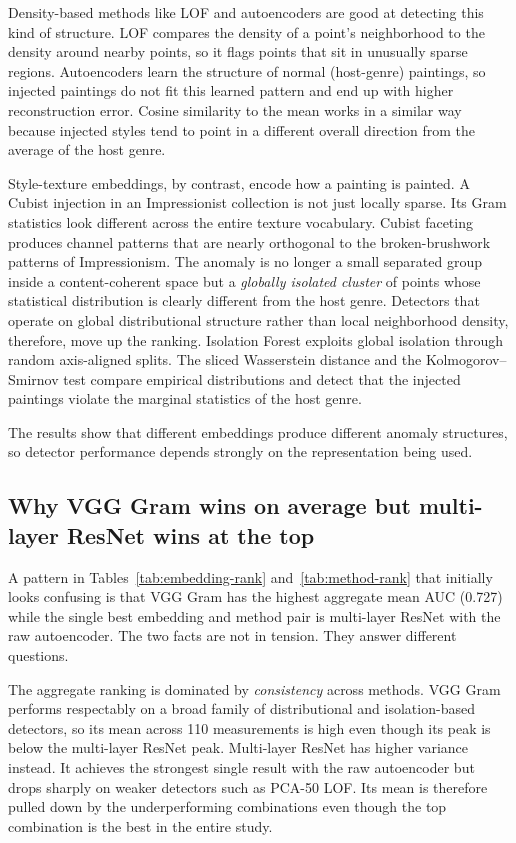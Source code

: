 \documentclass[conference]{IEEEtran}
\begin{document}
Density-based methods like LOF and autoencoders are good at detecting this kind of structure. LOF compares the density of a point’s neighborhood to the density around nearby points, so it flags points that sit in unusually sparse regions. Autoencoders learn the structure of normal (host-genre) paintings, so injected paintings do not fit this learned pattern and end up with higher reconstruction error. Cosine similarity to the mean works in a similar way because injected styles tend to point in a different overall direction from the average of the host genre.

Style-texture embeddings, by contrast, encode how a painting is painted. A Cubist injection in an Impressionist collection is not just locally sparse. Its Gram statistics look different across the entire texture vocabulary. Cubist faceting produces channel patterns that are nearly orthogonal to the broken-brushwork patterns of Impressionism. The anomaly is no longer a small separated group inside a content-coherent space but a \emph{globally isolated cluster} of points whose statistical distribution is clearly different from the host genre. Detectors that operate on global distributional structure rather than local neighborhood density, therefore, move up the ranking. Isolation Forest exploits global isolation through random axis-aligned splits. The sliced Wasserstein distance and the Kolmogorov--Smirnov test compare empirical distributions and detect that the injected paintings violate the marginal statistics of the host genre.

The results show that different embeddings produce different anomaly structures, so detector performance depends strongly on the representation being used.

\subsection{Why VGG Gram wins on average but multi-layer ResNet wins at the top}

A pattern in Tables~\ref{tab:embedding-rank} and~\ref{tab:method-rank} that initially looks confusing is that VGG Gram has the highest aggregate mean AUC (0.727) while the single best embedding and method pair is multi-layer ResNet with the raw autoencoder. The two facts are not in tension. They answer different questions.

The aggregate ranking is dominated by \emph{consistency} across methods. VGG Gram performs respectably on a broad family of distributional and isolation-based detectors, so its mean across 110 measurements is high even though its peak is below the multi-layer ResNet peak. Multi-layer ResNet has higher variance instead. It achieves the strongest single result with the raw autoencoder but drops sharply on weaker detectors such as PCA-50 LOF. Its mean is therefore pulled down by the underperforming combinations even though the top combination is the best in the entire study.
\end{document}
